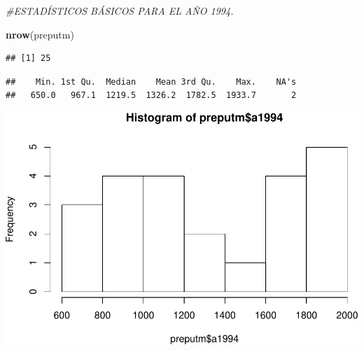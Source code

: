 \documentclass[11pt,]{article}
\newenvironment{Shaded}{\begin{snugshade}}{\end{snugshade}}
\newcommand{\KeywordTok}[1]{\textcolor[rgb]{0.13,0.29,0.53}{\textbf{#1}}}
\newcommand{\CommentTok}[1]{\textcolor[rgb]{0.56,0.35,0.01}{\textit{#1}}}
\newcommand{\OperatorTok}[1]{\textcolor[rgb]{0.81,0.36,0.00}{\textbf{#1}}}
\newcommand{\NormalTok}[1]{#1}
\begin{document}
\begin{Shaded}
\begin{Highlighting}[]
\CommentTok{#ESTADÍSTICOS BÁSICOS PARA EL AÑO 1994.}

\KeywordTok{nrow}\NormalTok{(preputm)}
\end{Highlighting}
\end{Shaded}

\begin{verbatim}
## [1] 25
\end{verbatim}

\begin{Shaded}
\end{Shaded}

\begin{verbatim}
##    Min. 1st Qu.  Median    Mean 3rd Qu.    Max.    NA's 
##   650.0   967.1  1219.5  1326.2  1782.5  1933.7       2
\end{verbatim}

\begin{Shaded}
\end{Shaded}

\includegraphics{proyecto_files/figure-latex/unnamed-chunk-3-1.pdf}

\begin{Shaded}
\end{Shaded}
\end{document}
